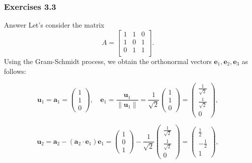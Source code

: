 \documentclass{beamer}
\begin{document}
\begin{frame}
    \frametitle{Exercises 3.3}
    \begin{block}{Answer}
        Let's consider the matrix
\[
A = \begin{bmatrix}
1 & 1 & 0 \\
1 & 0 & 1 \\
0 & 1 & 1 \\
\end{bmatrix}.
\]
Using the Gram-Schmidt process, we obtain the orthonormal vectors \( \mathbf{e}_1, \mathbf{e}_2, \mathbf{e}_3 \) as follows:

\[
\mathbf{u}_1 = \mathbf{a}_1 = \begin{pmatrix} 1 \\ 1 \\ 0 \end{pmatrix},
\quad
\mathbf{e}_1 = \frac{\mathbf{u}_1}{\|\mathbf{u}_1\|} = \frac{1}{\sqrt{2}} \begin{pmatrix} 1 \\ 1 \\ 0 \end{pmatrix} = \begin{pmatrix} \frac{1}{\sqrt{2}} \\ \frac{1}{\sqrt{2}} \\ 0 \end{pmatrix},
\]

\[
\mathbf{u}_2 = \mathbf{a}_2 - (\mathbf{a}_2 \cdot \mathbf{e}_1)\mathbf{e}_1 = \begin{pmatrix} 1 \\ 0 \\ 1 \end{pmatrix} - \frac{1}{\sqrt{2}}\begin{pmatrix} \frac{1}{\sqrt{2}} \\ \frac{1}{\sqrt{2}} \\ 0 \end{pmatrix} = \begin{pmatrix} \frac{1}{2} \\ -\frac{1}{2} \\ 1 \end{pmatrix},
\]
\end{block}
\end{frame}
\end{document}
